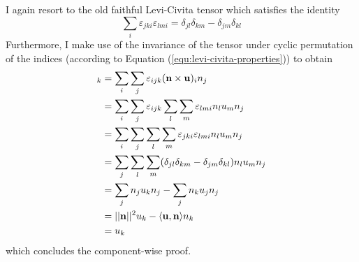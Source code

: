 \documentclass[11pt, a4paper]{article}
\begin{document}
I again resort to the old faithful Levi-Civita tensor which satisfies the
identity
\begin{equation}
    \sum_i \varepsilon_{jki} \varepsilon_{lmi} = \delta_{jl} \delta_{km} - \delta_{jm} \delta_{kl}
\end{equation}
Furthermore, I make use of the invariance of the tensor under cyclic permutation
of the indices (according to Equation (\ref{equ:levi-civita-properties})) to obtain
\begin{align}
    [(\mathbf{n} \times \mathbf{u}) \times \mathbf{n}]_k
    &= \sum_i \sum_j \varepsilon_{ijk} (\mathbf{n} \times \mathbf{u})_i n_j \notag \\ 
    &= \sum_i \sum_j \varepsilon_{ijk} \sum_l \sum_m \varepsilon_{lmi} n_l u_m n_j \notag \\ 
    &= \sum_i \sum_j \sum_l \sum_m \varepsilon_{jki} \varepsilon_{lmi} n_l u_m n_j \notag \\ 
    &= \sum_j \sum_l \sum_m (\delta_{jl} \delta_{km} - \delta_{jm} \delta_{kl}) n_l u_m n_j \notag \\
    &= \sum_j n_j u_k n_j - \sum_j n_k u_j n_j \notag \\
    &= ||\mathbf{n}||^2 u_k - \langle \mathbf{u}, \mathbf{n} \rangle n_k \notag \\ 
    &= u_k
\end{align}
which concludes the component-wise proof.
\end{document}
